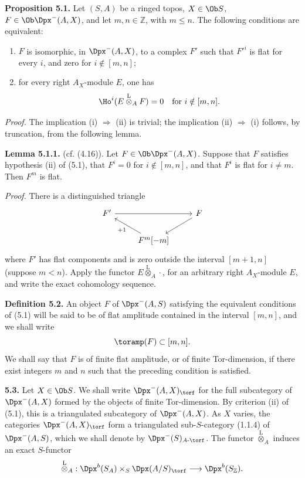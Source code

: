 \documentclass[11pt]{article}
\begin{document}
\textbf{Proposition 5.1.} Let \((S,A)\) be a ringed topos, \(X\in\Ob S\), \(F\in\Ob\Dpx^-(A,X)\), and let \(m,n\in\mathbb Z\), with \(m\leq n\). The following conditions are equivalent:
\begin{enumerate}[label=(\roman*)]
\item \(F\) is isomorphic, in \(\Dpx^-(A,X)\), to a complex \(F'\) such that \(F'^i\) is flat for every \(i\), and zero for \(i\notin[m,n]\);
\item for every right \(A_X\)-module \(E\), one has
\[
  \Ho^i(E\overset{\mathrm L}{\otimes}_A F)=0\quad\text{for }i\notin[m,n].
\]
\end{enumerate}

\emph{Proof.} The implication (i) \(\Rightarrow\) (ii) is trivial; the implication (ii) \(\Rightarrow\) (i) follows, by truncation, from the following lemma.

\textbf{Lemma 5.1.1.} (cf. (4.16)). Let \(F\in\Ob\Dpx^-(A,X)\). Suppose that \(F\) satisfies hypothesis (ii) of (5.1), that \(F^i=0\) for \(i\notin[m,n]\), and that \(F^i\) is flat for \(i\ne m\). Then \(F^m\) is flat.

\emph{Proof.} There is a distinguished triangle
\[
\begin{tikzcd}
F' \arrow[rr] && F \arrow[dl]\\
& F^m[-m] \arrow[ul,"+1"] &
\end{tikzcd}
\]
where \(F'\) has flat components and is zero outside the interval \([m+1,n]\) (suppose \(m<n\)). Apply the functor \(E\overset{\mathrm L}{\otimes}_A\cdot\), for an arbitrary right \(A_X\)-module \(E\), and write the exact cohomology sequence.

\textbf{Definition 5.2.} An object \(F\) of \(\Dpx^-(A,S)\) satisfying the equivalent conditions of (5.1) will be said to be of flat amplitude contained in the interval \([m,n]\), and we shall write
\[
  \toramp(F)\subset[m,n].
\]
We shall say that \(F\) is of finite flat amplitude, or of finite Tor-dimension, if there exist integers \(m\) and \(n\) such that the preceding condition is satisfied.

\textbf{5.3.} Let \(X\in\Ob S\). We shall write \(\Dpx^-(A,X)_{\torf}\) for the full subcategory of \(\Dpx^-(A,X)\) formed by the objects of finite Tor-dimension. By criterion (ii) of (5.1), this is a triangulated subcategory of \(\Dpx^-(A,X)\). As \(X\) varies, the categories \(\Dpx^-(A,X)_{\torf}\) form a triangulated sub-\(S\)-category (1.1.4) of \(\Dpx^-(A,S)\), which we shall denote by \(\Dpx^-(S)_{A\text{-}\torf}\). The functor \(\overset{\mathrm L}{\otimes}_A\) induces an exact \(S\)-functor
\[
  \overset{\mathrm L}{\otimes}_A:
  \Dpx^b(S_A)\times_S \Dpx(A/S)_{\torf}
  \longrightarrow \Dpx^b(S_{\mathbb Z}).
\]
\end{document}
